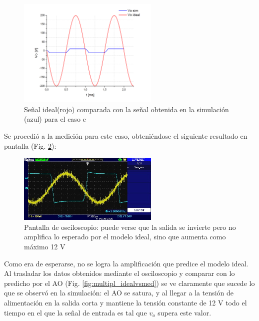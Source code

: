 \begin{figure}[h]
  \centering
      \includegraphics[width=0.6\textwidth]{gfxhernan/fig27.PNG}
  \caption{Señal ideal(rojo) comparada con la señal obtenida en la simulación (azul) para el caso c}
  \label{fig:multipl_c_idealvssim}
\end{figure}

Se procedió a la medición para este caso, obteniéndose el siguiente resultado en pantalla (Fig. \ref{fig:multipl_c_med}):

\begin{figure}[H]
  \centering
      \includegraphics[width=0.6\textwidth]{gfxhernan/amplipartecmed.jpg}
  \caption{Pantalla de osciloscopio: puede verse que la salida se invierte pero no amplifica lo esperado por el modelo ideal, sino que aumenta como máximo 12 V}
  \label{fig:multipl_c_med}
\end{figure}

Como era de esperarse, no se logra la amplificación que predice el modelo ideal. Al trasladar los datos obtenidos mediante el osciloscopio y comparar con lo predicho por el AO (Fig. \ref{fig:multipl_idealvsmed}) se ve claramente que sucede lo que se observó en la simulación: el AO se satura, y al llegar a la tensión de alimentación en la salida corta y mantiene la tensión constante de 12 V todo el tiempo en el que la señal de entrada es tal que $v_{o}$ supera este valor.

